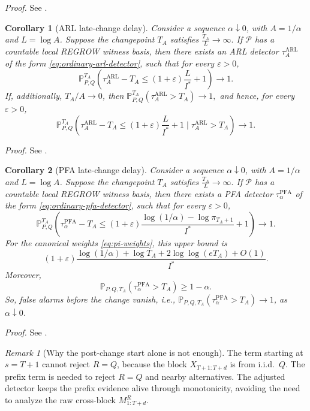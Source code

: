 \documentclass[12pt]{article}
\theoremstyle{spaced}
\newtheorem{corollary}[corollary]{Corollary}
\theoremstyle{remark}
\newtheorem{remark}[remark]{Remark}
\newcommand{\calP}{\mathcal P}
\newcommand{\eps}{\varepsilon}
\newcommand{\Pchg}[3]{\mathbb P_{#1,#2,#3}}
\begin{document}
\emph{Proof.} See .



\begin{corollary}[ARL late-change delay]\label{cor:arl-delay}
 Consider a sequence $\alpha\downarrow 0$, with $A=1/\alpha$ and $L=\log A$.  Suppose the changepoint $T_A$ satisfies $ \frac{T_A}{L}\to\infty.$
 If $\calP$ has a countable local REGROW witness basis, then there exists an ARL detector $\tau_A^{\mathrm{ARL}}$ of the form \eqref{eq:ordinary-arl-detector}, such that for every $\eps>0$,
\[
  \mathbb P_{P,Q}^{T_A}\left(
  \tau_A^{\mathrm{ARL}}-T_A
  \le
  (1+\eps)\frac{L}{I^*}+1
  \right)\to1.
\]
If, additionally, $T_A/A\to0$, then
$\mathbb P_{P,Q}^{T_A}(\tau_A^{\mathrm{ARL}}>T_A)\to1,$ and hence,
for every $\eps>0$,
\[
  \mathbb P_{P,Q}^{T_A}\left(
  \tau_A^{\mathrm{ARL}}-T_A
  \le
  (1+\eps)\frac{L}{I^*}+1
  \mid \tau_A^{\mathrm{ARL}}>T_A\right)\to1.
\]
\end{corollary}


\emph{Proof.} See .


\begin{corollary}[PFA late-change delay]\label{cor:pfa-delay}
Consider a sequence $\alpha\downarrow 0$, with $A=1/\alpha$ and $L=\log A$.  Suppose the changepoint $T_A$ satisfies $ \frac{T_A}{L}\to\infty.$
 If $\calP$ has a countable local REGROW witness basis, then there exists a PFA detector $\tau_\alpha^{\mathrm{PFA}}$ of the form \eqref{eq:ordinary-pfa-detector}, such that for every $\eps>0$,
\[
  \mathbb P_{P,Q}^{T_A}\left(
  \tau_\alpha^{\mathrm{PFA}}-T_A
  \le
  (1+\eps)\frac{\log(1/\alpha)-\log\pi_{T_A+1}}{I^*}+1
  \right)\to1.
\]
For the canonical weights \eqref{eq:pi-weights}, this upper bound is
\[
  (1+\eps)\frac{
    \log(1/\alpha)+\log T_A+2\log\log(eT_A)+O(1)
  }{I^*}.
\]
Moreover,
\[
  \Pchg{P}{Q}{T_A}(\tau_\alpha^{\mathrm{PFA}}> T_A)
  \ge1- \alpha.
\]
So, false alarms before the change vanish,  i.e., $\Pchg{P}{Q}{T_A}(\tau_\alpha^{\mathrm{PFA}}> T_A)\to 1$, as $\alpha\downarrow0$.
\end{corollary}


\emph{Proof.} See .


\begin{remark}[Why the post-change start alone is not enough]
The term starting at $s=T+1$ cannot reject $R=Q$, because the block $X_{T+1:T+d}$ is from i.i.d.\ $Q$.  The prefix term is needed to reject $R=Q$ and nearby alternatives.  The adjusted detector keeps the prefix evidence alive through monotonicity, avoiding the need to analyze the raw cross-block $M_{1:T+d}^R$.
\end{remark}
\end{document}
